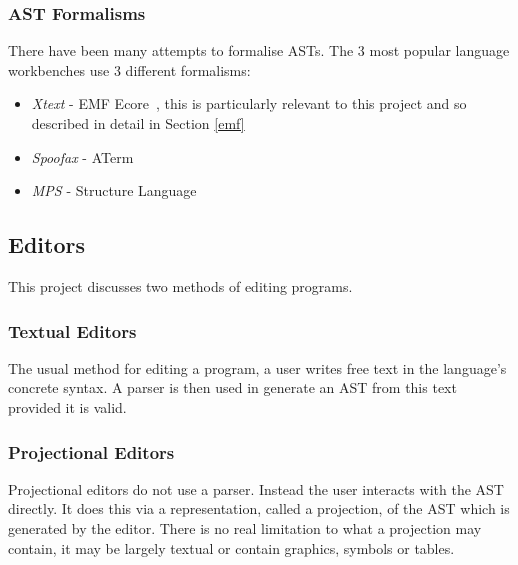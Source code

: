 \documentclass{article}
\begin{document}
\subsubsection{AST Formalisms}\label{astFormalisms}
There have been many attempts to formalise ASTs. The 3 most popular language workbenches use 3 different formalisms: \begin{itemize}
\item \emph{Xtext} - EMF Ecore~\cite{emf}, this is particularly relevant to this project and so described in detail in Section \ref{emf}
\item \emph{Spoofax} - ATerm~\cite{aterm} 
\item \emph{MPS} - Structure Language~\cite{mpsStructureLanguage} 
\end{itemize}
%
\subsection{Editors}
This project discusses two methods of editing programs.
\subsubsection{Textual Editors}
The usual method for editing a program, a user writes free text in the language's concrete syntax. A parser is then used in generate an AST from this text provided it is valid.
\subsubsection{Projectional Editors}
Projectional editors do not use a parser. Instead the user interacts with the AST directly. It does this via a representation, called a projection, of the AST which is generated by the editor. There is no real limitation to what a projection may contain, it may be largely textual or contain graphics, symbols or tables. 

\end{document}

